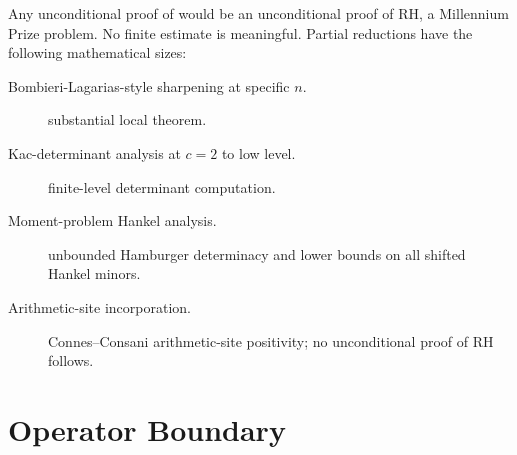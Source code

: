 \begin{remark}
\label{v4-arith:vb:rem:substantial}
Any unconditional proof of  would be
an unconditional proof of RH, a Millennium Prize problem. No
finite estimate is meaningful. Partial reductions have the following
mathematical sizes:
\begin{description}
\item[Bombieri-Lagarias-style sharpening at specific \(n\).]
substantial local theorem.
\item[Kac-determinant analysis at \(c=2\) to low level.]
finite-level determinant computation.
\item[Moment-problem Hankel analysis.] unbounded Hamburger
determinacy and lower bounds on all shifted Hankel minors.
\item[Arithmetic-site incorporation.] Connes--Consani arithmetic-site
positivity; no unconditional proof of RH follows.
\end{description}
\end{remark}

\section{Operator Boundary}
\label{v4-arith:vb:summary}

